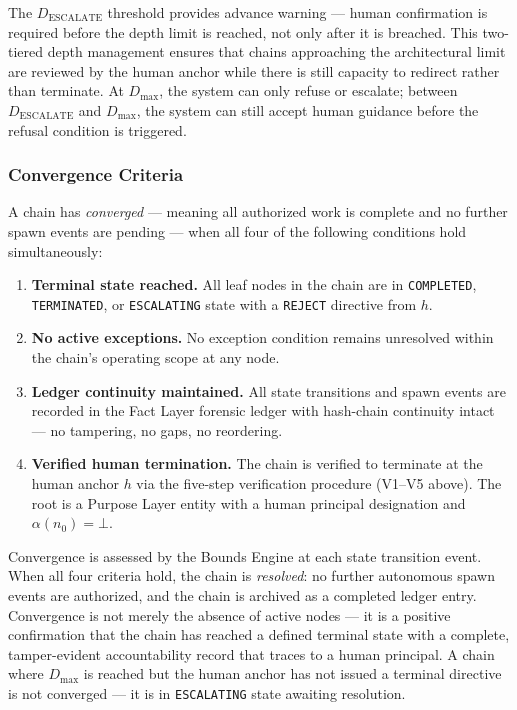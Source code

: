 The $D_{\text{ESCALATE}}$ threshold provides advance warning — human confirmation is required before the depth limit is reached, not only after it is breached. This two-tiered depth management ensures that chains approaching the architectural limit are reviewed by the human anchor while there is still capacity to redirect rather than terminate. At $D_{\max}$, the system can only refuse or escalate; between $D_{\text{ESCALATE}}$ and $D_{\max}$, the system can still accept human guidance before the refusal condition is triggered.

\subsubsection{Convergence Criteria}

A chain has \emph{converged} — meaning all authorized work is complete and no further spawn events are pending — when all four of the following conditions hold simultaneously:

\begin{enumerate}
    \item[(C1)] \textbf{Terminal state reached.} All leaf nodes in the chain are in \texttt{COMPLETED}, \texttt{TERMINATED}, or \texttt{ESCALATING} state with a \texttt{REJECT} directive from $h$.
    \item[(C2)] \textbf{No active exceptions.} No exception condition remains unresolved within the chain's operating scope at any node.
    \item[(C3)] \textbf{Ledger continuity maintained.} All state transitions and spawn events are recorded in the Fact Layer forensic ledger with hash-chain continuity intact — no tampering, no gaps, no reordering.
    \item[(C4)] \textbf{Verified human termination.} The chain is verified to terminate at the human anchor $h$ via the five-step verification procedure (V1–V5 above). The root is a Purpose Layer entity with a human principal designation and $\alpha(n_0) = \bot$.
\end{enumerate}

Convergence is assessed by the Bounds Engine at each state transition event. When all four criteria hold, the chain is \emph{resolved}: no further autonomous spawn events are authorized, and the chain is archived as a completed ledger entry. Convergence is not merely the absence of active nodes — it is a positive confirmation that the chain has reached a defined terminal state with a complete, tamper-evident accountability record that traces to a human principal. A chain where $D_{\max}$ is reached but the human anchor has not issued a terminal directive is not converged — it is in \texttt{ESCALATING} state awaiting resolution.

